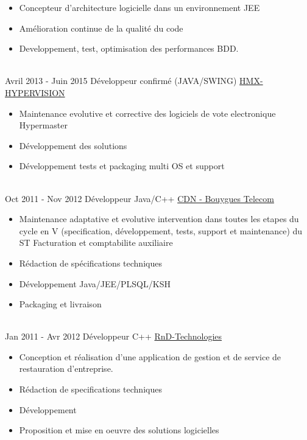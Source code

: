 \documentclass[letterpaper]{twentysecondcv} %
\begin{document}
\begin{twenty}
{{\begin{itemize}
     		des complements securitaires et d'integration au SI existant (Active Directory).
     		\item Concepteur d'architecture logicielle dans un environnement JEE
     		\item Amélioration continue de la qualité du code
     		\item Developpement, test, optimisation des performances BDD.
    	\end{itemize}}
        }
     \\
     \twentyitem
   		{Avril 2013 -}
		{Juin 2015}
        {Développeur confirmé (JAVA/SWING)}
        {\href{}{HMX-HYPERVISION}}
        {}
        {
        \begin{itemize}
        	\item Maintenance evolutive et corrective des logiciels de vote electronique Hypermaster
        	\item Développement des solutions
        	\item Développement tests et packaging multi OS et support
    	\end{itemize}
    	}
        
       \\
    \twentyitem
    {Oct 2011 -}
    {Nov 2012}
    {Développeur Java/C++}
    {\href{https://www.jobs.bouyguestelecom.fr/}{CDN - Bouygues Telecom}}
    {}
    {
        \begin{itemize}
        	\item Maintenance adaptative et evolutive intervention dans toutes les etapes du cycle en V (specification, développement, tests, support et maintenance) du ST Facturation et comptabilite auxiliaire
        	\item Rédaction de spécifications techniques
        	\item Développement Java/JEE/PLSQL/KSH
        	\item Packaging et livraison	
        \end{itemize}
    }
    
           \\
    \twentyitem
    {Jan 2011 -}
    {Avr 2012}
    {Développeur C++}
    {\href{}{RnD-Technologies}}
    {}
    {
    	\begin{itemize}
		\item Conception et réalisation d'une application de gestion et de service de restauration d'entreprise.
		\item Rédaction de specifications techniques
		\item Développement
		\item Proposition et mise en oeuvre des solutions logicielles	
    	\end{itemize}
    }


\end{twenty}
\end{document}
